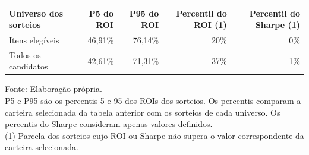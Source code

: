 \begingroup
\setlength{}
\setlength{}
\fontsize{9.0pt}{10.8pt}\selectfont

\setlength{\LTpost}{0mm}
\begin{longtable}{@{\extracolsep{\fill}}lrrrr}

\toprule
\textbf{Universo dos sorteios} & \textbf{P5 do ROI} & \textbf{P95 do ROI} & \textbf{Percentil do ROI} (1) & \textbf{Percentil do Sharpe} (1) \\ 
\midrule\addlinespace[2.5pt]
Itens elegíveis & 46,91\% & 76,14\% & 20\% & 0\% \\
Todos os candidatos & 42,61\% & 71,31\% & 37\% & 1\% \\
\bottomrule
\end{longtable}
\begin{minipage}{\linewidth}
Fonte: Elaboração própria.\\
P5 e P95 são os percentis 5 e 95 dos ROIs dos sorteios. Os percentis comparam a carteira selecionada da tabela anterior com os sorteios de cada universo. Os percentis do Sharpe consideram apenas valores definidos.\\
(1) Parcela dos sorteios cujo ROI ou Sharpe não supera o valor correspondente da carteira selecionada.\\
\end{minipage}
\endgroup
